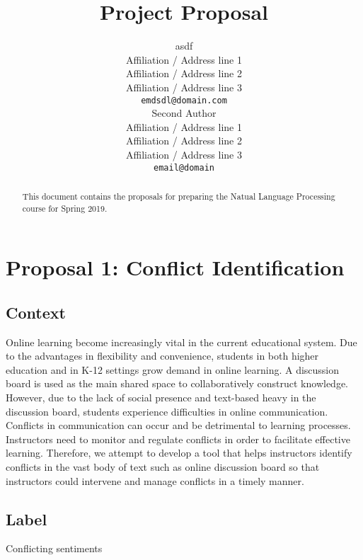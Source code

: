 \documentclass[11pt,a4paper]{article}
\title{Project Proposal}
\author{asdf \\
  Affiliation / Address line 1 \\
  Affiliation / Address line 2 \\
  Affiliation / Address line 3 \\
  \texttt{emdsdl@domain.com} \\\And
  Second Author \\
  Affiliation / Address line 1 \\
  Affiliation / Address line 2 \\
  Affiliation / Address line 3 \\
  \texttt{email@domain} \\}
\date{}
\begin{document}
\maketitle
\begin{abstract}
  This document contains the proposals for preparing the Natual Language Processing course for Spring 2019. 
\end{abstract}

\section{Proposal 1: Conflict Identification}

\subsection{Context}
Online learning become increasingly vital in the current educational system. Due to the advantages in flexibility and convenience, students in both higher education and in K-12 settings grow demand in online learning. A discussion board is used as the main shared space to collaboratively construct knowledge. However, due to the lack of social presence and text-based heavy in the discussion board, students experience difficulties in online communication. Conflicts in communication can occur and be detrimental to learning processes. Instructors need to monitor and regulate conflicts in order to facilitate effective learning. Therefore, we attempt  to develop a tool that helps instructors identify conflicts in the vast body of text such as online discussion board so that instructors could intervene and manage conflicts in a timely manner. 

\subsection{Label}
Conflicting sentiments
\end{document}
